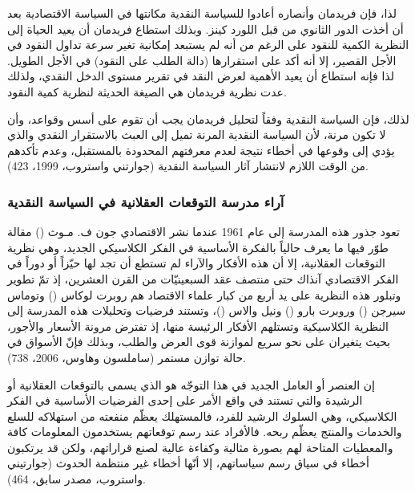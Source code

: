 \documentclass[10pt,a4paper]{report}
\begin{document}
\begin{doublespacing}
لذا، فإن فريدمان وأنصاره أعادوا للسياسة النقدية مكانتها في السياسة الاقتصادية بعد أن أخذت الدور الثانوي من قبل اللورد كينز. وبذلك استطاع فريدمان أن يعيد الحياة إلى النظرية الكمية للنقود على الرغم من أنه لم يستبعد إمكانية تغير سرعة تداول النقود في الأجل القصير، إلا أنه أكد على استقرارها (دالة الطلب على النقود) في الأجل الطويل. لذا فإنه استطاع أن يعيد الأهمية لعرض النقد في تقرير مستوى الدخل النقدي، ولذلك عدت نظرية فريدمان هي الصيغة الحديثة لنظرية كمية النقود.

لذلك، فإن السياسة النقدية وفقاً لتحليل فريدمان يجب أن تقوم على أسس وقواعد، وأن لا تكون مرنة، لأن السياسة النقدية المرنة تميل إلى العبث بالاستقرار النقدي والذي يؤدي إلى وقوعها في أخطاء نتيجة لعدم معرفتهم المحدودة بالمستقبل، وعدم تأكدهم من الوقت اللازم لانتشار آثار السياسة النقدية (جوارتني واستروب، 1999، 423).
\subsubsection{آراء مدرسة التوقعات العقلانية في السياسة النقدية}
تعود جذور هذه المدرسة إلى عام 1961 عندما نشر الاقتصادي جون ف. مـوث () مقالة طوّر فيها ما يعرف حالياً بالفكرة الأساسية في الفكر الكلاسيكي الجديد، وهي نظرية التوقعات العقلانية، إلا أن هذه الأفكار والآراء لم تستطع أن تجد لها حيّزاً أو دوراً في الفكر الاقتصادي آنذاك حتى منتصف عقد السبعينيّات من القرن العشرين، إذ تمّ تطوير وتبلور هذه النظرية على يد أربع من كبار علماء الاقتصاد هم روبرت لوكاس () وتوماس سيرجن () وروبرت بارو () ونيل والاس ()، وتستند فرضيات وتحليلات هذه المدرسة إلى النظرية الكلاسيكية وتستلهم الأفكار الرئيسة منها، إذ تفترض مرونة الأسعار والأجور، بحيث يتغيران على نحو سريع لموازنة قوى العرض والطلب، وبذلك فإنّ الأسواق في حالة توازن مستمر ({ساملسون وهاوس، 2006، 738}).

إن العنصر أو العامل الجديد في هذا التوجّه هو الذي يسمى بالتوقعات العقلانية أو الرشيدة والتي تستند في واقع الأمر على إحدى الفرضيات الأساسية في الفكر الكلاسيكي، وهي السلوك الرشيد للفرد، فالمستهلك يعظّم منفعته من استهلاكه للسلع والخدمات والمنتج يعظّم ربحه. فالأفراد عند رسم توقعاتهم يستخدمون المعلومات كافة والمعطيات المتاحة لهم بصورة مثالية وكفاءة عالية لصنع قراراتهم، ولكن قد يرتكبون أخطاء في سياق رسم سياساتهم، إلا أنّها أخطاء غير منتظمة الحدوث ({جوارتيني واستروب، مصدر سابق، 464}).


\end{doublespacing}
\end{document}
